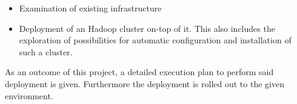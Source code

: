 \begin{itemize}
    \item Examination of existing infrastructure
    \item Deployment of an Hadoop cluster on-top of it. 
    This also includes the exploration of possibilities for automatic configuration 
    and installation of such a cluster.
\end{itemize}

As an outcome of this project, 
a detailed execution plan to perform said deployment is given.
Furthermore the deployment is rolled out to the given environment. 



